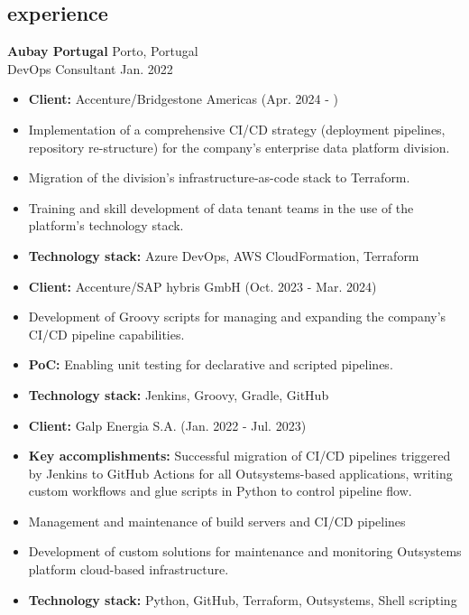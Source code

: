 \documentclass[12pt]{article}
\newcommand{\entry}[4]{{{\textbf{#1}}} \hfill #3 \\ #2 \hfill #4}
\begin{document}
\begin{paracol}{2}
\switchcolumn*

\section{experience}

\entry{Aubay Portugal}{DevOps Consultant}{Porto, Portugal}{Jan. 2022}
\begin{itemize}[noitemsep,leftmargin=3.5mm,rightmargin=0mm,topsep=6pt]
  \item \textbf{Client:} Accenture/Bridgestone Americas (Apr. 2024 - )
  \item Implementation of a comprehensive CI/CD strategy (deployment pipelines, repository re-structure) for the company's enterprise data platform division.
  \item Migration of the division's infrastructure-as-code stack to Terraform.
  \item Training and skill development of data tenant teams in the use of the platform's technology stack.
  \item \textbf{Technology stack:} Azure DevOps, AWS CloudFormation, Terraform
  \medskip
  \item \textbf{Client:} Accenture/SAP hybris GmbH (Oct. 2023 - Mar. 2024)
  \item Development of Groovy scripts for managing and expanding the company's CI/CD pipeline capabilities.
  \item \textbf{PoC:} Enabling unit testing for declarative and scripted pipelines.
  \item \textbf{Technology stack:} Jenkins, Groovy, Gradle, GitHub
  \medskip
  \item \textbf{Client:} Galp Energia S.A. (Jan. 2022 - Jul. 2023)
  \item \textbf{Key accomplishments:} Successful migration of CI/CD pipelines triggered by Jenkins to GitHub Actions for all Outsystems-based applications, writing custom workflows and glue scripts in Python to control pipeline flow.
  \item Management and maintenance of build servers and CI/CD pipelines
  \item Development of custom solutions for maintenance and monitoring Outsystems platform cloud-based
  infrastructure.
  \item \textbf{Technology stack:} Python, GitHub, Terraform, Outsystems, Shell scripting
\end{itemize}

\medskip


\end{paracol}
\end{document}
